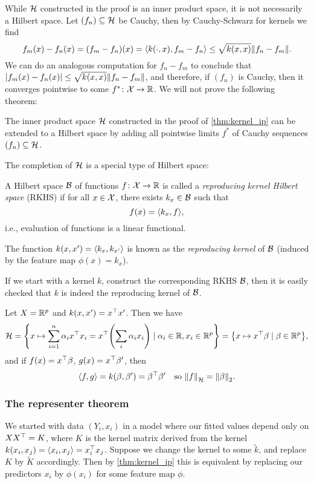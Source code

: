 While $\mathcal H$ constructed in the proof is an inner product space, it is not necessarily a Hilbert space. Let $(f_n) \subseteq \mathcal H$ be Cauchy, then by Cauchy-Schwarz for kernels we find
\[
f_m(x) - f_n(x) = (f_m - f_n)(x) = \langle k(\cdot, x), f_m - f_n\rangle \leq \sqrt{k(x, x)} \norm{f_n - f_m}. 
\]
We can do an analogous computation for $f_n - f_m$ to conclude that $\abs{f_m(x) - f_n(x)} \leq \sqrt{k(x, x)} \norm{f_n - f_m}$, and therefore, if $(f_n)$ is Cauchy, then it converges pointwise to some $f^* \colon \mathcal X \to \mathbb R$. We will not prove the following theorem:
\begin{theorem} \label{thm:kernel_ip_hilbert}
    The inner product space $\mathcal H$ constructed in the proof of \cref{thm:kernel_ip} can be extended to a Hilbert space by adding all pointwise limits $f^*$ of Cauchy sequences $(f_n) \subseteq \mathcal H$. 
\end{theorem}

The completion of $\mathcal H$ is a special type of Hilbert space:
\begin{definition}
    A Hilbert space $\mathcal B$ of functions $f \colon \mathcal X \to \mathbb R$ is called a \emph{reproducing kernel Hilbert space} (RKHS) if for all $x \in \mathcal X$, there exists $k_x \in \mathcal B$ such that 
    \[
    f(x) = \langle k_x, f\rangle, 
    \]
    i.e., evaluation of functions is a linear functional. 
    
    The function $k(x, x') = \langle k_x, k_{x'}\rangle$ is known as the \emph{reproducing kernel} of $\mathcal B$ (induced by the feature map $\phi(x) = k_x$). 
\end{definition}

If we start with a kernel $k$, construct the corresponding RKHS $\mathcal B$, then it is easily checked that $k$ is indeed the reproducing kernel of $\mathcal B$. 

\begin{example}
    Let $X = \mathbb R^p$ and $k(x, x') = x^\top x'$. Then we have 
    \[
    \mathcal H = \qty{x \mapsto \sum_{i=1}^n \alpha_i x^\top x_i = x^\top\qty(\sum_i \alpha_i x_i) \mid \alpha_i \in \mathbb R, x_i \in \mathbb R^p} = \qty{x \mapsto x^\top\beta \mid \beta \in \mathbb R^p},
    \]
    and if $f(x) = x^\top\beta$, $g(x) = x^\top \beta'$, then 
    \[
    \langle f, g\rangle = k(\beta, \beta') = \beta^\top \beta' \quad\text{so } \norm{f}_\mathcal H = \norm{\beta}_2. 
    \]
\end{example}

\subsubsection{The representer theorem}
We started with data $(Y_i, x_i)$ in a model where our fitted values depend only on $XX^\top = K$, where $K$ is the kernel matrix derived from the kernel $k(x_i, x_j) = \langle x_i, x_j\rangle = x_i^\top x_j$. Suppose we change the kernel to some $\tilde k$, and replace $K$ by $\tilde K$ accordingly. Then by \cref{thm:kernel_ip} this is equivalent by replacing our predictors $x_i$ by $\phi(x_i)$ for some feature map $\phi$. 

